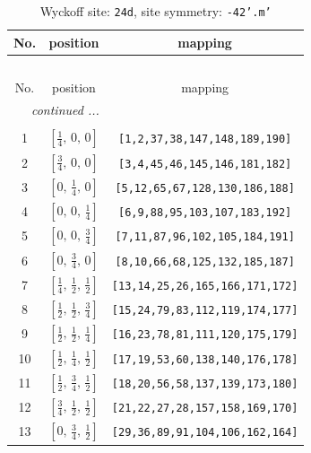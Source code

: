 \documentclass[fleqn,8pt]{jsarticle}
\begin{document}
\begin{longtable}{ccc}
\caption{Wyckoff site: {\tt 24d}, site symmetry: {\tt -42'.m'}}
 \\
 \hline \hline
No. & position & mapping \\ \hline \endfirsthead

\multicolumn{2}{l}{\tablename\ \thetable{}} \\
 \hline \hline
No. & position & mapping \\ \hline \endhead

 \hline \hline
\multicolumn{2}{r}{\footnotesize\it continued ...} \\ \endfoot

 \hline \hline
\multicolumn{2}{r}{} \\ \endlastfoot

1 & $\left[ \frac{1}{4},\, 0,\, 0 \right]$ & {\tt [1,2,37,38,147,148,189,190]} \\ \hline
2 & $\left[ \frac{3}{4},\, 0,\, 0 \right]$ & {\tt [3,4,45,46,145,146,181,182]} \\ \hline
3 & $\left[ 0,\, \frac{1}{4},\, 0 \right]$ & {\tt [5,12,65,67,128,130,186,188]} \\ \hline
4 & $\left[ 0,\, 0,\, \frac{1}{4} \right]$ & {\tt [6,9,88,95,103,107,183,192]} \\ \hline
5 & $\left[ 0,\, 0,\, \frac{3}{4} \right]$ & {\tt [7,11,87,96,102,105,184,191]} \\ \hline
6 & $\left[ 0,\, \frac{3}{4},\, 0 \right]$ & {\tt [8,10,66,68,125,132,185,187]} \\ \hline
7 & $\left[ \frac{1}{4},\, \frac{1}{2},\, \frac{1}{2} \right]$ & {\tt [13,14,25,26,165,166,171,172]} \\ \hline
8 & $\left[ \frac{1}{2},\, \frac{1}{2},\, \frac{3}{4} \right]$ & {\tt [15,24,79,83,112,119,174,177]} \\ \hline
9 & $\left[ \frac{1}{2},\, \frac{1}{2},\, \frac{1}{4} \right]$ & {\tt [16,23,78,81,111,120,175,179]} \\ \hline
10 & $\left[ \frac{1}{2},\, \frac{1}{4},\, \frac{1}{2} \right]$ & {\tt [17,19,53,60,138,140,176,178]} \\ \hline
11 & $\left[ \frac{1}{2},\, \frac{3}{4},\, \frac{1}{2} \right]$ & {\tt [18,20,56,58,137,139,173,180]} \\ \hline
12 & $\left[ \frac{3}{4},\, \frac{1}{2},\, \frac{1}{2} \right]$ & {\tt [21,22,27,28,157,158,169,170]} \\ \hline
13 & $\left[ 0,\, \frac{3}{4},\, \frac{1}{2} \right]$ & {\tt [29,36,89,91,104,106,162,164]} \\ \hline

\end{longtable}
\end{document}
